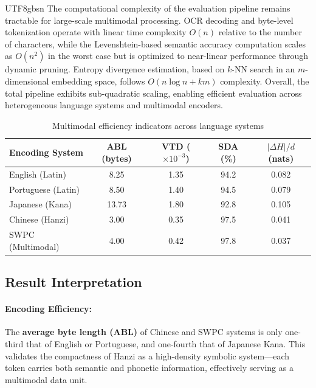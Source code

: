 \documentclass[conference]{IEEEtran}
\begin{document}
\begin{CJK*}{UTF8}{gbsn}
The computational complexity of the evaluation pipeline remains tractable for large-scale multimodal processing. OCR decoding and byte-level tokenization operate with linear time complexity $O(n)$ relative to the number of characters, while the Levenshtein-based semantic accuracy computation scales as $O(n^2)$ in the worst case but is optimized to near-linear performance through dynamic pruning. Entropy divergence estimation, based on $k$-NN search in an $m$-dimensional embedding space, follows $O(n \log n + km)$ complexity. Overall, the total pipeline exhibits sub-quadratic scaling, enabling efficient evaluation across heterogeneous language systems and multimodal encoders.

\begin{table}[htbp]
\centering
\caption{Multimodal efficiency indicators across language systems}
\label{tab:efficiency_metrics}
\footnotesize
\renewcommand{\arraystretch}{1.2}
\begin{tabular}{lcccc}
\toprule
\textbf{Encoding System} & \textbf{ABL (bytes)} & \textbf{VTD ($\times10^{-3}$)} & \textbf{SDA (\%)} & \textbf{$|\Delta H|/d$ (nats)} \\
\midrule
English (Latin) & 8.25 & 1.35 & 94.2 & 0.082 \\
Portuguese (Latin) & 8.50 & 1.40 & 94.5 & 0.079 \\
Japanese (Kana) & 13.73 & 1.80 & 92.8 & 0.105 \\
Chinese (Hanzi) & 3.00 & 0.35 & 97.5 & 0.041 \\
SWPC (Multimodal) & 4.00 & 0.42 & 97.8 & 0.037 \\
\bottomrule
\end{tabular}
\end{table}

\subsection{Result Interpretation}

\paragraph{Encoding Efficiency:}  
The \textbf{average byte length (ABL)} of Chinese and SWPC systems is only one-third that of English or Portuguese, and one-fourth that of Japanese Kana.  
This validates the compactness of Hanzi as a high-density symbolic system—each token carries both semantic and phonetic information, effectively serving as a multimodal data unit.


\end{CJK*}
\end{document}
